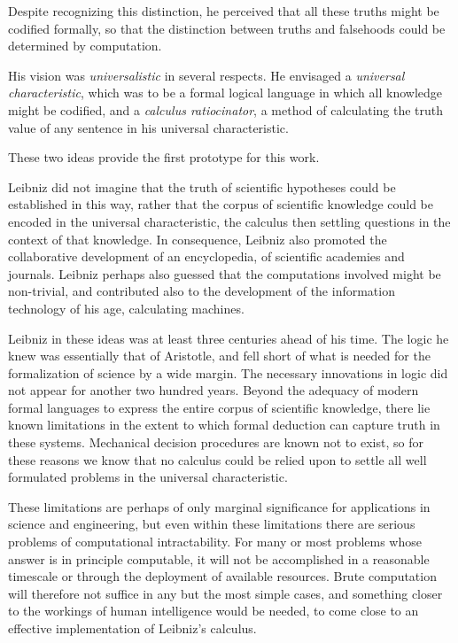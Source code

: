 Despite recognizing this distinction, he perceived that all these
truths might be codified formally, so that the distinction between
truths and falsehoods could be determined by computation. 

His vision was \emph{universalistic} in several respects.
He envisaged a \emph{universal
  characteristic}, which was to be a
formal logical language in which all knowledge might be codified, and
a \emph{calculus ratiocinator}, a method
of calculating the truth value of any sentence in his universal
characteristic. 

These two ideas provide the first prototype for this work.

Leibniz did not imagine that the truth of scientific hypotheses could
be established in this way, rather that the corpus of scientific
knowledge could be encoded in the universal characteristic, the
calculus then settling questions in the context of that knowledge. 
In consequence, Leibniz also promoted the collaborative development of
an encyclopedia, of scientific academies and journals. 
Leibniz perhaps also guessed that the computations involved might be
non-trivial, and contributed also to the development of the
information technology of his age, calculating machines. 

Leibniz in these ideas was at least three centuries ahead of his time.
The logic he knew was essentially that of Aristotle, and fell short of
what is needed for the formalization of science by a wide margin. 
The necessary innovations in logic did not appear for another two
hundred years. 
Beyond the adequacy of modern formal languages to express the entire
corpus of scientific knowledge, there lie known limitations in the
extent to which formal deduction can capture truth in these systems. 
Mechanical decision procedures are known not to exist, so for these
reasons we know that no calculus could be relied upon to settle all
well formulated problems in the universal characteristic. 

These limitations are perhaps of only marginal significance for
applications in science and engineering, but even within these
limitations there are serious problems of computational
intractability. 
For many or most problems whose answer is in principle computable, it
will not be accomplished in a reasonable timescale or through the
deployment of available resources. 
Brute computation will therefore not suffice in any but the most
simple cases, and something closer to the workings of human
intelligence would be needed, to come close to an effective
implementation of Leibniz's calculus. 

